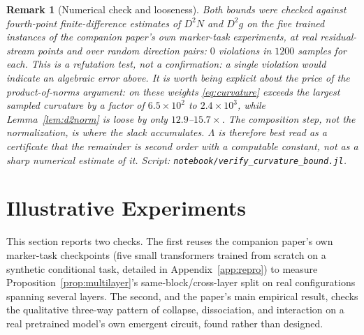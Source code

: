 \documentclass[11pt,a4paper]{article}
\newtheorem{remark}{Remark}
\begin{document}
\begin{remark}[Numerical check and looseness]
\label{rem:curvature-check}
Both bounds were checked against fourth-point finite-difference estimates of
$D^2N$ and $D^2g$ on the five trained instances of the companion paper's own
marker-task experiments, at real residual-stream points and over random
direction pairs: $0$ violations in $1200$ samples for each. This is a
refutation test, not a confirmation: a single violation would indicate an
algebraic error above. It is worth being explicit about the price of the
product-of-norms argument: on these weights \eqref{eq:curvature} exceeds the
largest sampled curvature by a factor of $6.5\times10^2$ to $2.4\times10^3$,
while Lemma~\ref{lem:d2norm} is loose by only $12.9$--$15.7\times$. The
composition step, not the normalization, is where the slack accumulates.
$\Lambda$ is therefore best read as a certificate that the remainder is
second order with a computable constant, not as a sharp numerical estimate of
it. Script: \texttt{notebook/\allowbreak verify\_curvature\_bound.jl}.
\end{remark}

\section{Illustrative Experiments}
\label{sec:experiments}

This section reports two checks. The first reuses the companion paper's own
marker-task checkpoints (five small transformers trained from scratch on a
synthetic conditional task, detailed in Appendix~\ref{app:repro}) to measure
Proposition~\ref{prop:multilayer}'s same-block/cross-layer split on real
configurations spanning several layers. The second, and the paper's main
empirical result, checks the qualitative three-way pattern of collapse,
dissociation, and interaction on a real pretrained model's own emergent
circuit, found rather than designed.
\end{document}
